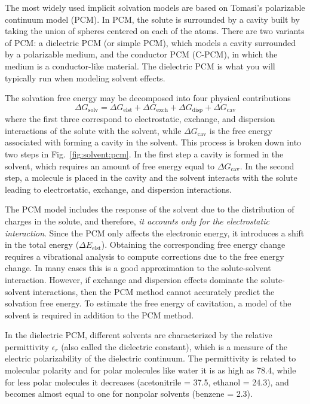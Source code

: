 \documentclass[../Main/notes.tex]{subfiles}
\begin{document}
The most widely used implicit solvation models are based on Tomasi's polarizable continuum model (PCM).
In PCM, the solute is surrounded by a cavity built by taking the union of spheres centered on each of the atoms.
There are two variants of PCM: a dielectric PCM (or simple PCM), which models a cavity surrounded by a polarizable medium, and the conductor PCM (C-PCM), in which the medium is a conductor-like material.
The dielectric PCM is what you will typically run when modeling solvent effects.

The solvation free energy may be decomposed into four physical contributions
\begin{equation}
\Delta G_\mathrm{solv}= \Delta G_\mathrm{elst} + \Delta G_\mathrm{exch} + \Delta G_\mathrm{disp} + \Delta G_\mathrm{cav}
\end{equation}
where the first three correspond to electrostatic, exchange, and dispersion interactions of the solute with the solvent, while $\Delta G_\mathrm{cav}$ is the free energy associated with forming a cavity in the solvent.
This process is broken down into two steps in Fig.~\ref{fig:solvent:pcm}.
In the first step a cavity is formed in the solvent, which requires an amount of free energy equal to $\Delta G_\mathrm{cav}$.
In the second step, a molecule is placed in the cavity and the solvent interacts with the solute leading to electrostatic, exchange, and dispersion interactions.

The PCM model includes the response of the solvent due to the distribution of charges in the solute, and therefore, \emph{it accounts only for the electrostatic interaction}.
Since the PCM only affects the electronic energy, it introduces a shift in the total energy ($\Delta E_\mathrm{elst}$).
Obtaining the corresponding free energy change requires a vibrational analysis to compute corrections due to the free energy change.
In many cases this is a good approximation to the solute-solvent interaction.
However, if exchange and dispersion effects dominate the solute-solvent interactions, then the PCM method cannot accurately predict the solvation free energy.
To estimate the free energy of cavitation, a model of the solvent is required in addition to the PCM method.

In the dielectric PCM, different solvents are characterized by the relative permittivity $\epsilon_r$ (also called the dielectric constant), which is a measure of the electric polarizability of the dielectric continuum. The permittivity is related to molecular polarity and for polar molecules like water it is as high as 78.4, while for less polar molecules it decreases (acetonitrile = 37.5, ethanol = 24.3), and becomes almost equal to one for nonpolar solvents (benzene = 2.3).
\end{document}
